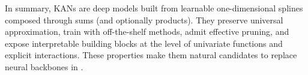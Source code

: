 In summary, KANs are deep models built from learnable one-dimensional splines composed through sums (and optionally products). They preserve universal approximation, train with off-the-shelf methods, admit effective pruning, and expose interpretable building blocks at the level of univariate functions and explicit interactions. These properties make them natural candidates to replace neural backbones in \ours.


